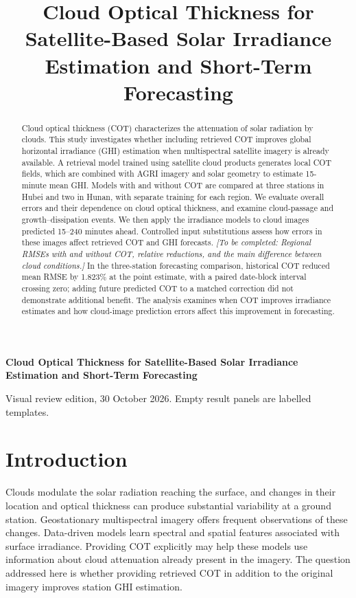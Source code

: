 \documentclass[11pt]{article}
\title{Cloud Optical Thickness for Satellite-Based Solar Irradiance Estimation and Short-Term Forecasting}
\author{}\date{}
\newcommand{\pending}[1]{{\color{pendingcolor}\textit{[To be completed: #1]}}}
\begin{document}
\begin{center}\LARGE\bfseries
Cloud Optical Thickness for Satellite-Based Solar Irradiance Estimation and Short-Term Forecasting
\end{center}
\begin{center}\small Visual review edition, 30 October 2026. Empty result panels are labelled templates.\end{center}
\begin{abstract}
Cloud optical thickness (COT) characterizes the attenuation of solar radiation by clouds. This study investigates whether including retrieved COT improves global horizontal irradiance (GHI) estimation when multispectral satellite imagery is already available. A retrieval model trained using satellite cloud products generates local COT fields, which are combined with AGRI imagery and solar geometry to estimate 15-minute mean GHI. Models with and without COT are compared at three stations in Hubei and two in Hunan, with separate training for each region. We evaluate overall errors and their dependence on cloud optical thickness, and examine cloud-passage and growth--dissipation events. We then apply the irradiance models to cloud images predicted 15--240 minutes ahead. Controlled input substitutions assess how errors in these images affect retrieved COT and GHI forecasts. \pending{Regional RMSEs with and without COT, relative reductions, and the main difference between cloud conditions.} In the three-station forecasting comparison, historical COT reduced mean RMSE by 1.823\% at the point estimate, with a paired date-block interval crossing zero; adding future predicted COT to a matched correction did not demonstrate additional benefit. The analysis examines when COT improves irradiance estimates and how cloud-image prediction errors affect this improvement in forecasting.
\end{abstract}

\section{Introduction}
Clouds modulate the solar radiation reaching the surface, and changes in their location and optical thickness can produce substantial variability at a ground station. Geostationary multispectral imagery offers frequent observations of these changes. Data-driven models learn spectral and spatial features associated with surface irradiance. Providing COT explicitly may help these models use information about cloud attenuation already present in the imagery. The question addressed here is whether providing retrieved COT in addition to the original imagery improves station GHI estimation.
\end{document}
